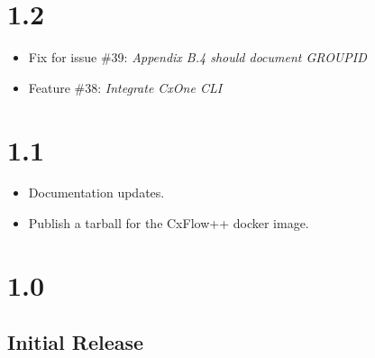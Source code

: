 
\section{1.2}

\begin{itemize}
    \item Fix for issue \#39: \textit{Appendix B.4 should document GROUP\textunderscore ID}
    \item Feature \#38: \textit{Integrate CxOne CLI}
\end{itemize}

\section{1.1}

\begin{itemize}
    \item Documentation updates.
    \item Publish a tarball for the CxFlow++ docker image.
\end{itemize}

\section{1.0}

\subsection*{Initial Release}

